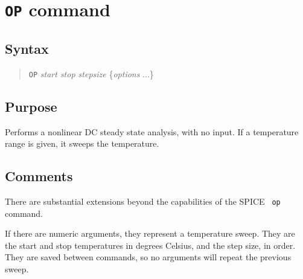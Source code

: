 %
%
%
%
\section{{\tt OP} command}
\subsection{Syntax}
\begin{verse}
{\tt OP} {\it start stop stepsize} \{{\it options} ...\}
\end{verse}
\subsection{Purpose}

Performs a nonlinear DC steady state analysis, with no input.  If a
temperature range is given, it sweeps the temperature.
\subsection{Comments}

There are substantial extensions beyond the capabilities of the SPICE {\tt
op} command.

If there are numeric arguments, they represent a temperature sweep.  They are
the start and stop temperatures in degrees Celsius, and the step size, in
order.  They are saved between commands, so no arguments will repeat the
previous sweep.

